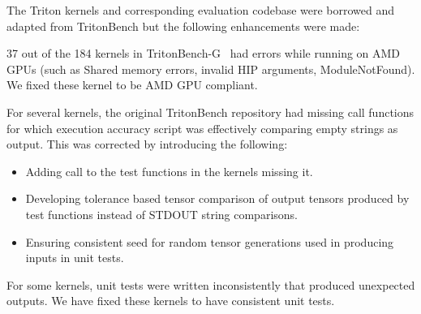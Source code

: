 

The Triton kernels and corresponding evaluation codebase were borrowed and adapted from TritonBench but the following enhancements were made: 

37 out of the 184 kernels in TritonBench-G~\cite{li2025tritonbenchbenchmarkinglargelanguage} had errors while running on AMD GPUs (such as Shared memory errors, invalid HIP arguments, ModuleNotFound). We fixed these kernel to be AMD GPU compliant.

For several kernels, the original TritonBench repository had missing call functions for which execution accuracy script was effectively comparing empty strings as output. This was corrected by introducing the following:
\begin{itemize}
    \item Adding call to the test functions in the kernels missing it.
    \item Developing tolerance based tensor comparison of output tensors produced by test functions instead of STDOUT string comparisons.
    \item Ensuring consistent seed for random tensor generations used in producing inputs in unit tests.
\end{itemize}

For some kernels, unit tests were written inconsistently that produced unexpected outputs. We have fixed these kernels to have consistent unit tests. 

